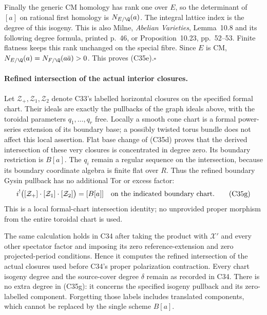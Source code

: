 Finally the generic CM homology has rank one over $E$,
so the determinant of $[a]$ on rational first homology is
$N_{E/\Q}(a)$. The integral lattice index is the degree
of this isogeny. This is also Milne, \emph{Abelian
Varieties}, Lemma~10.8 and its following degree formula,
printed p.~46, or Proposition~10.23, pp.~52--53.
Finite flatness keeps this rank unchanged on the special
fibre. Since $E$ is CM, $N_{E/\Q}(a)=N_{F/\Q}(a\bar a)>0$.
This proves (C35e).\hfill$\square$

\paragraph{Refined intersection of the actual interior closures.}
Let $\mathcal Z_+,\mathcal Z_1,\mathcal Z_2$ denote
C33's labelled horizontal closures on the specified
formal chart. Their ideals are exactly the pullbacks of
the graph ideals above, with the toroidal parameters
$q_1,\ldots,q_r$ free. Locally a smooth cone chart is a
formal power-series extension of its boundary base; a
possibly twisted torus bundle does not affect this local
assertion. Flat base change of (C35d) proves that the
derived intersection of these very closures is concentrated
in degree zero. Its boundary restriction is $B[a]$.
The $q_i$ remain a regular sequence on the intersection,
because its boundary coordinate algebra is finite flat
over $R$. Thus the refined boundary Gysin pullback has
no additional Tor or excess factor:
\[
 i^!\bigl([\mathcal Z_+]\cdot[\mathcal Z_1]
                         \cdot[\mathcal Z_2]\bigr)
       =[B[a]]\quad\hbox{on the indicated boundary chart}.
 \tag{C35g}
\]
This is a local formal-chart intersection identity; no
unprovided proper morphism from the entire toroidal
chart is used.

The same calculation holds in C34 after taking the product
with $\mathcal X'$ and every other spectator factor and
imposing its zero reference-extension and zero projected-period
conditions. Hence it computes the refined intersection of
the actual closures used before C34's proper polarization
contraction. Every chart isogeny degree and the source-cover
degree $\delta$ remain as recorded in C34. There is no
extra degree in (C35g): it concerns the specified isogeny
pullback and its zero-labelled component. Forgetting those
labels includes translated components, which cannot be
replaced by the single scheme $B[a]$.

